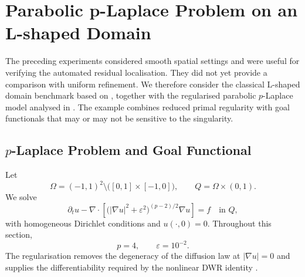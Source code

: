 \section{Parabolic p-Laplace Problem on an L-shaped Domain}
\label{sec:lshape-plaplace}

The preceding experiments considered smooth spatial settings and were useful for verifying the automated residual localisation. They did not yet provide a comparison with uniform refinement. We therefore consider the classical L-shaped domain benchmark based on \cite[Section~6.4]{ENDTMAYER202419}, together with the regularised parabolic $p$-Laplace model analysed in \cite{R6}. The example combines reduced primal regularity with goal functionals that may or may not be sensitive to the singularity.


\subsection{$p$-Laplace Problem and Goal Functional}
\label{subsec:lshape-benchmark}

Let
\[
  \Omega=(-1,1)^2\setminus\bigl([0,1]\times[-1,0]\bigr),
  \qquad Q=\Omega\times(0,1).
\]
We solve
\begin{equation}
  \partial_t u
  -\nabla\cdot\left[
    \bigl(|\nabla u|^2+\varepsilon^2\bigr)^{(p-2)/2}
    \nabla u
  \right]=f
  \quad\text{in }Q,
\end{equation}
with homogeneous Dirichlet conditions and $u(\cdot,0)=0$. Throughout this section,
\[
p=4,\qquad \varepsilon=10^{-2}.
\]
The regularisation removes the degeneracy of the diffusion law at $|\nabla u|=0$ and supplies the differentiability required by the nonlinear DWR identity \cite{R6}.




